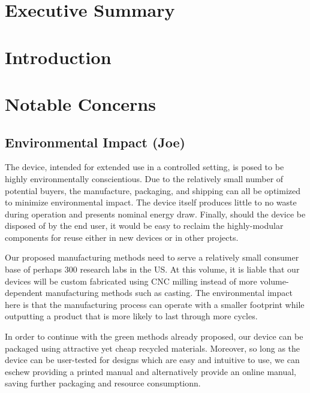 \documentclass{article}
\begin{document}

\setcounter{tocdepth}{2}
\tableofcontents
\newpage
\listoftables
\listoffigures
\newpage


\section*{Executive Summary}
\label{sec:exec-summary}



\newpage


\section{Introduction}
\label{sec:introduction}



\section{Notable Concerns}
\label{sec:concerns}



\subsection{Environmental Impact (Joe)}
\label{sec:environment}

The device, intended for extended use in a controlled setting, is
posed to be highly environmentally conscientious. Due to the
relatively small number of potential buyers, the manufacture,
packaging, and shipping can all be optimized to minimize environmental
impact. The device itself produces little to no waste during operation
and presents nominal energy draw. Finally, should the device be
disposed of by the end user, it would be easy to reclaim the
highly-modular components for reuse either in new devices or in other
projects.

Our proposed manufacturing methods need to serve a relatively small
consumer base of perhaps 300 research labs in the US. At this volume,
it is liable that our devices will be custom fabricated using CNC
milling instead of more volume-dependent manufacturing methods such as
casting. The environmental impact here is that the manufacturing
process can operate with a smaller footprint while outputting a
product that is more likely to last through more cycles.

In order to continue with the green methods already proposed, our
device can be packaged using attractive yet cheap recycled
materials. Moreover, so long as the device can be user-tested for
designs which are easy and intuitive to use, we can eschew providing a
printed manual and alternatively provide an online manual, saving
further packaging and resource consumptionn.
\end{document}
